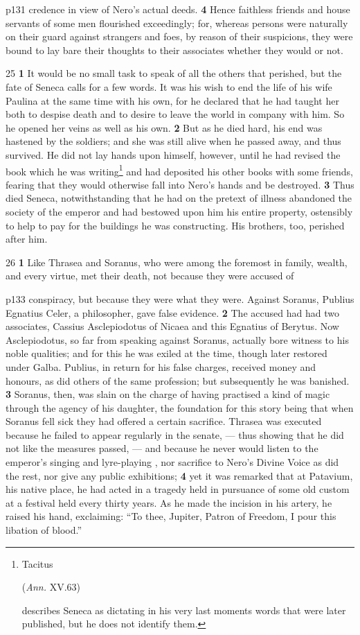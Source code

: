 p131 credence in view of Nero's actual deeds. \textbf{4} Hence faithless friends and house servants of some men flourished exceedingly; for, whereas persons were naturally on their guard against strangers and foes, by reason of their suspicions, they were bound to lay bare their thoughts to their associates whether they would or not.

25
\textbf{1} It would be no small task to speak of all the others that perished, but the fate of Seneca calls for a few words. It was his wish to end the life of his wife Paulina at the same time with his own, for he declared that he had taught her both to despise death and to desire to leave the world in company with him. So he opened her veins as well as his own. \textbf{2} But as he died hard, his end was hastened by the soldiers; and she was still alive when he passed away, and thus survived. He did not lay hands upon himself, however, until he had revised the book which he was writing\texthebrew{⁠}\footnote{Tacitus

(\emph{Ann.} XV.63)

describes Seneca as dictating in his very last moments words that were later published, but he does not identify them.

} and had deposited his other books with some friends, fearing that they would otherwise fall into Nero's hands and be destroyed. \textbf{3} Thus died Seneca, notwithstanding that he had on the pretext of illness abandoned the society of the emperor and had bestowed upon him his entire property, ostensibly to help to pay for the buildings he was constructing. His brothers, too, perished after him.

26
\textbf{1} Like Thrasea and Soranus, who were among the foremost in family, wealth, and every virtue, met their death, not because they were accused of

p133 conspiracy, but because they were what they were. Against Soranus, Publius Egnatius Celer, a philosopher, gave false evidence. \textbf{2} The accused had had two associates, Cassius Asclepiodotus of Nicaea and this Egnatius of Berytus. Now Asclepiodotus, so far from speaking against Soranus, actually bore witness to his noble qualities; and for this he was exiled at the time, though later restored under Galba. Publius, in return for his false charges, received money and honours, as did others of the same profession; but subsequently he was banished. \textbf{3} Soranus, then, was slain on the charge of having practised a kind of magic through the agency of his daughter, the foundation for this story being that when Soranus fell sick they had offered a certain sacrifice. Thrasea was executed because he failed to appear regularly in the senate, \texthebrew{—} thus showing that he did not like the measures passed, \texthebrew{—} and because he never would listen to the emperor's singing and lyre-playing , nor sacrifice to Nero's Divine Voice as did the rest, nor give any public exhibitions; \textbf{4} yet it was remarked that at Patavium, his native place, he had acted in a tragedy held in pursuance of some old custom at a festival held every thirty years. As he made the incision in his artery, he raised his hand, exclaiming: ``To thee, Jupiter, Patron of Freedom, I pour this libation of blood.''

